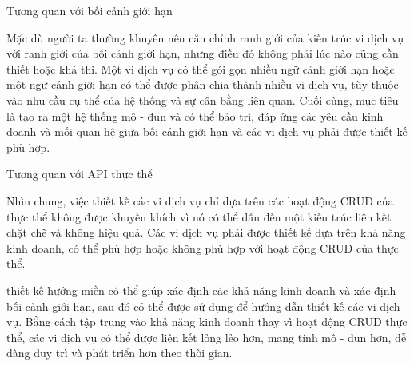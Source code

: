 Tương quan với bối cảnh giới hạn

Mặc dù người ta thường khuyên nên căn chỉnh ranh giới của kiến trúc vi dịch vụ với ranh giới của bối cảnh giới hạn, nhưng điều đó không phải lúc nào cũng cần thiết hoặc khả thi. Một vi dịch vụ có thể gói gọn nhiều ngữ cảnh giới hạn hoặc một ngữ cảnh giới hạn có thể được phân chia thành nhiều vi dịch vụ, tùy thuộc vào nhu cầu cụ thể của hệ thống và sự cân bằng liên quan. Cuối cùng, mục tiêu là tạo ra một hệ thống mô - đun và có thể bảo trì, đáp ứng các yêu cầu kinh doanh và mối quan hệ giữa bối cảnh giới hạn và các vi dịch vụ phải được thiết kế phù hợp.

Tương quan với API thực thể

Nhìn chung, việc thiết kế các vi dịch vụ chỉ dựa trên các hoạt động CRUD của thực thể không được khuyến khích vì nó có thể dẫn đến một kiến trúc liên kết chặt chẽ và không hiệu quả. Các vi dịch vụ phải được thiết kế dựa trên khả năng kinh doanh, có thể phù hợp hoặc không phù hợp với hoạt động CRUD của thực thể.

thiết kế hướng miền có thể giúp xác định các khả năng kinh doanh và xác định bối cảnh giới hạn, sau đó có thể được sử dụng để hướng dẫn thiết kế các vi dịch vụ. Bằng cách tập trung vào khả năng kinh doanh thay vì hoạt động CRUD thực thể, các vi dịch vụ có thể được liên kết lỏng lẻo hơn, mang tính mô - đun hơn, dễ dàng duy trì và phát triển hơn theo thời gian.

